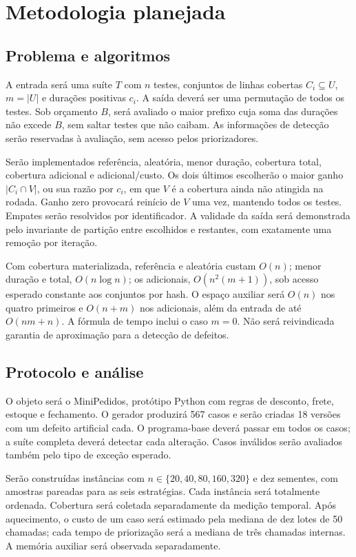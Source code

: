 \documentclass[12pt]{article}
\begin{document}
\section{Metodologia planejada}
\subsection{Problema e algoritmos}
A entrada será uma suíte $T$ com $n$ testes, conjuntos de linhas cobertas $C_i\subseteq U$, $m=|U|$ e durações positivas $c_i$. A saída deverá ser uma permutação de todos os testes. Sob orçamento $B$, será avaliado o maior prefixo cuja soma das durações não excede $B$, sem saltar testes que não caibam. As informações de detecção serão reservadas à avaliação, sem acesso pelos priorizadores.

Serão implementados referência, aleatória, menor duração, cobertura total, cobertura adicional e adicional/custo. Os dois últimos escolherão o maior ganho $|C_i\cap V|$, ou sua razão por $c_i$, em que $V$ é a cobertura ainda não atingida na rodada. Ganho zero provocará reinício de $V$ uma vez, mantendo todos os testes. Empates serão resolvidos por identificador. A validade da saída será demonstrada pelo invariante de partição entre escolhidos e restantes, com exatamente uma remoção por iteração.

Com cobertura materializada, referência e aleatória custam $O(n)$; menor duração e total, $O(n\log n)$; os adicionais, $O(n^2(m+1))$, sob acesso esperado constante aos conjuntos por hash. O espaço auxiliar será $O(n)$ nos quatro primeiros e $O(n+m)$ nos adicionais, além da entrada de até $O(nm+n)$. A fórmula de tempo inclui o caso $m=0$. Não será reivindicada garantia de aproximação para a detecção de defeitos.

\subsection{Protocolo e análise}
O objeto será o MiniPedidos, protótipo Python com regras de desconto, frete, estoque e fechamento. O gerador produzirá 567 casos e serão criadas 18 versões com um defeito artificial cada. O programa-base deverá passar em todos os casos; a suíte completa deverá detectar cada alteração. Casos inválidos serão avaliados também pelo tipo de exceção esperado.

Serão construídas instâncias com $n\in\{20,40,80,160,320\}$ e dez sementes, com amostras pareadas para as seis estratégias. Cada instância será totalmente ordenada. Cobertura será coletada separadamente da medição temporal. Após aquecimento, o custo de um caso será estimado pela mediana de dez lotes de 50 chamadas; cada tempo de priorização será a mediana de três chamadas internas. A memória auxiliar será observada separadamente.
\end{document}
